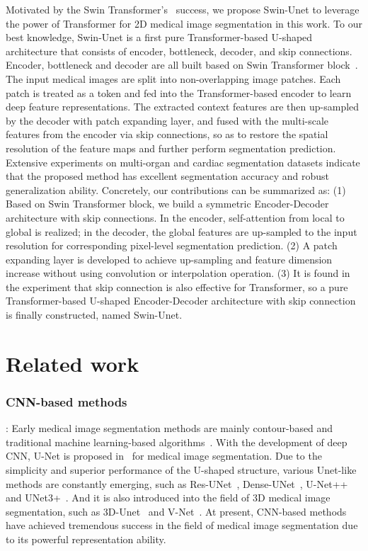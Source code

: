 \documentclass[runningheads]{llncs}
\begin{document}
Motivated by the Swin Transformer's~\cite{swin} success, we propose Swin-Unet to leverage the power of Transformer for 2D medical image segmentation in this work. To our best knowledge, Swin-Unet is a first pure Transformer-based U-shaped architecture that consists of encoder, bottleneck, decoder, and skip connections. Encoder, bottleneck and decoder are all built based on Swin Transformer block~\cite{swin}. The input medical images are split into non-overlapping image patches. Each patch is treated as a token and fed into the Transformer-based encoder to learn deep feature representations. The extracted context features are then up-sampled by the decoder with patch expanding layer, and fused with the multi-scale features from the encoder via skip connections, so as to restore the spatial resolution of the feature maps and further perform segmentation prediction.  Extensive experiments on multi-organ and cardiac segmentation datasets indicate that the proposed method has excellent segmentation accuracy and robust generalization ability. Concretely, our contributions can be summarized as: (1) Based on Swin Transformer block, we build a symmetric Encoder-Decoder architecture with skip connections. In the encoder, self-attention from local to global is realized; in the decoder, the global features are up-sampled to the input resolution for corresponding pixel-level segmentation prediction. (2) A patch expanding layer is developed to achieve up-sampling and feature dimension increase without using convolution or interpolation operation. (3) It is found in the experiment that skip connection is also effective for Transformer, so a pure Transformer-based U-shaped Encoder-Decoder architecture with skip connection is finally constructed, named Swin-Unet.

 \section{Related work}

\subsubsection{CNN-based methods}:
Early medical image segmentation methods are mainly contour-based and traditional machine learning-based algorithms~\cite{shape,markov}. With the development of deep CNN, U-Net is proposed in~\cite{unet} for medical image segmentation. Due to the simplicity and superior performance of the U-shaped structure, various Unet-like methods are constantly emerging, such as Res-UNet~\cite{res-unet}, Dense-UNet~\cite{denseunet}, U-Net++~\cite{Unet++} and UNet3+~\cite{unet3+}. And it is also introduced into the field of 3D medical image segmentation, such as 3D-Unet~\cite{3D-UNet} and V-Net~\cite{VNet}. At present, CNN-based methods have achieved tremendous success in the field of medical image segmentation due to its powerful representation ability.
\end{document}
